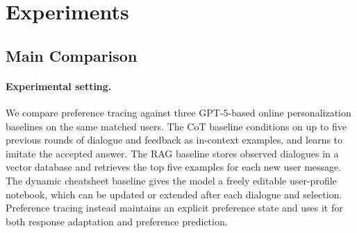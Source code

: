 
\section{Experiments}

\subsection{Main Comparison}

\paragraph{Experimental setting.}
We compare preference tracing against three GPT-5-based online personalization baselines on
the same matched users. The CoT baseline conditions on up to five previous rounds of dialogue
and feedback as in-context examples, and learns to imitate the accepted answer. The RAG
baseline stores observed dialogues in a vector database and retrieves the top five examples
for each new user message. The dynamic cheatsheet baseline gives the model a freely editable
user-profile notebook, which can be updated or extended after each dialogue and selection.
Preference tracing instead maintains an explicit preference state and uses it for both
response adaptation and preference prediction.

